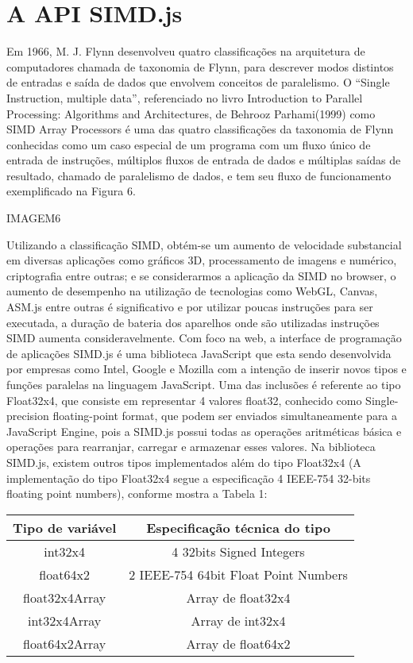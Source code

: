 \documentclass{article}
\begin{document}
\section{A API SIMD.js}

Em 1966, M. J. Flynn desenvolveu quatro classificações na arquitetura de computadores
chamada de taxonomia de Flynn, para descrever modos distintos de entradas e saída de
dados que envolvem conceitos de paralelismo. O “Single Instruction, multiple data”,
referenciado no livro Introduction to Parallel Processing: Algorithms and Architectures, de
Behrooz Parhami(1999) como SIMD Array Processors é uma das quatro classificações da
taxonomia de Flynn conhecidas como um caso especial de um programa com um fluxo
único de entrada de instruções, múltiplos fluxos de entrada de dados e múltiplas saídas de
resultado, chamado de paralelismo de dados, e tem seu fluxo de funcionamento
exemplificado na Figura 6.

IMAGEM6

Utilizando a classificação SIMD, obtém-se um aumento de velocidade substancial em
diversas aplicações como gráficos 3D, processamento de imagens e numérico, criptografia
entre outras; e se considerarmos a aplicação da SIMD no browser, o aumento de
desempenho na utilização de tecnologias como WebGL, Canvas, ASM.js entre outras é
significativo e por utilizar poucas instruções para ser executada, a duração de bateria dos
aparelhos onde são utilizadas instruções SIMD aumenta consideravelmente.
Com foco na web, a interface de programação de aplicações SIMD.js é uma biblioteca
JavaScript que esta sendo desenvolvida por empresas como Intel, Google e Mozilla com a
intenção de inserir novos tipos e funções paralelas na linguagem JavaScript. Uma das
inclusões é referente ao tipo Float32x4, que consiste em representar 4 valores float32,
conhecido como Single-precision floating-point format, que podem ser enviados
simultaneamente para a JavaScript Engine, pois a SIMD.js possui todas as operações
aritméticas básica e operações para rearranjar, carregar e armazenar esses valores.
Na biblioteca SIMD.js, existem outros tipos implementados além do tipo Float32x4 (A
implementação do tipo Float32x4 segue a especificação 4 IEEE-754 32-bits floating point
numbers), conforme mostra a Tabela 1:

\begin{tabular}{|c|c|}
\hline
Tipo de variável & Especificação técnica do tipo\\
\hline
int32x4 & 4 32bits Signed Integers \\
\hline
float64x2 & 2 IEEE-754 64bit Float Point Numbers \\
\hline
float32x4Array & Array de float32x4 \\
\hline
int32x4Array & Array de int32x4 \\
\hline
float64x2Array & Array de float64x2 \\
\hline
\end{tabular}
\end{document}
